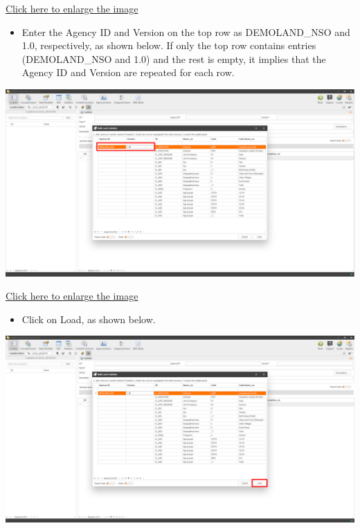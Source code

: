 \documentclass[
]{book}
\providecommand{\tightlist}{%
  \setlength{\itemsep}{0pt}\setlength{\parskip}{0pt}}
\theoremstyle{definition}
\theoremstyle{definition}
\theoremstyle{definition}
\theoremstyle{definition}
\theoremstyle{remark}
\begin{document}
\href{images/image090.png}{Click here to enlarge the image}

\begin{itemize}
\tightlist
\item
  Enter the Agency ID and Version on the top row as DEMOLAND\_NSO and 1.0, respectively, as shown below. If only the top row contains entries (DEMOLAND\_NSO and 1.0) and the rest is empty, it implies that the Agency ID and Version are repeated for each row.
\end{itemize}

\begin{center}\includegraphics[width=1\linewidth]{./images/image092} \end{center}

\href{images/image092.png}{Click here to enlarge the image}

\begin{itemize}
\tightlist
\item
  Click on Load, as shown below.
\end{itemize}

\begin{center}\includegraphics[width=1\linewidth]{./images/image094} \end{center}
\end{document}
